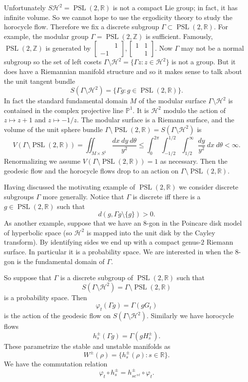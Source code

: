 \documentclass[12pt]{report}
\newcommand{\ZZ}{\mathbb{Z}}
\newcommand{\RR}{\mathbb{R}}
\newcommand{\PP}{\mathbb{P}}
\newcommand{\HH}{\mathcal H}
\newcommand{\PSL}{\operatorname{PSL}}
\theoremstyle{definition}
\begin{document}
Unfortunately $S\HH^2 = \PSL(2, \RR)$ is not a compact Lie group; in fact, it has infinite volume. So we cannot hope to use the ergodicity theory to study the horocycle flow.
Therefore we fix a discrete subgroup $\Gamma \subset \PSL(2, \RR)$. For example, the modular group $\Gamma = \PSL(2, \ZZ)$ is sufficient.
Famously, $\PSL(2, \ZZ)$ is generated by $\begin{bmatrix}&1\\-1\end{bmatrix},\begin{bmatrix}1&1\\&1\end{bmatrix}$.
Now $\Gamma$ may not be a normal subgroup so the set of left cosets $\Gamma \setminus \HH^2 = \{\Gamma z: z \in \HH^2\}$ is not a group.
But it does have a Riemannian manifold structure and so it makes sense to talk about the unit tangent bundle
$$S(\Gamma \setminus \HH^2) = \{\Gamma g: g \in \PSL(2, \RR)\}.$$
In fact the standard fundamental domain $M$ of the modular surface $\Gamma \setminus \HH^2$ is contained in the complex projective line $\PP^1$.
It is $\HH^2$ modulo the action of $z \mapsto z + 1$ and $z \mapsto -1/z$. The modular surface is a Riemann surface, and the volume of the unit sphere bundle $\Gamma \setminus \PSL(2, \RR) = S(\Gamma \setminus \HH^2)$ is
$$V(\Gamma \setminus \PSL(2, \RR)) = \iint_{M \times S^1} \frac{dx~dy~d\theta}{y^2} \leq \int_0^{2\pi} \int_{-1/2}^{1/2} \int_{1/2}^\infty \frac{dy}{y^2}~dx~d\theta < \infty.$$
Renormalizing we assume $V(\Gamma \setminus \PSL(2, \RR)) = 1$ as necessary. Then the geodesic flow and the horocycle flows drop to an action on $\Gamma \setminus \PSL(2, \RR)$.

Having discussed the motivating example of $\PSL(2, \RR)$ we consider discrete subgroups $\Gamma$ more generally.
Notice that $\Gamma$ is discrete iff there is a $g \in \PSL(2, \RR)$ such that
$$d(g, \Gamma g \setminus \{g\}) > 0.$$
As another example, suppose that we have an $8$-gon in the Poincare disk model of hyperbolic space (so $\HH^2$ is mapped into the unit disk by the Cayley transform).
By identifying sides we end up with a compact genus-$2$ Riemann surface. In particular it is a probability space. We are interested in when the $8$-gon is the fundamental domain of $\Gamma$.

So suppose that $\Gamma$ is a discrete subgroup of $\PSL(2, \RR)$ such that
$$S(\Gamma \setminus \HH^2) = \Gamma \setminus \PSL(2, \RR)$$
is a probability space. Then
$$\varphi_t(\Gamma g) = \Gamma (g G_t)$$
is the action of the geodesic flow on $S(\Gamma \setminus \HH^2)$.
Similarly we have horocycle flows
$$h_s^\pm(\Gamma g) = \Gamma(g H^\pm_s).$$
These parametrize the stable and unstable manifolds as
$$W^\pm(\rho) = \{h_s^\pm(\rho): s \in \RR\}.$$
We have the commutation relation
$$\varphi_t \circ h_s^\pm = h_{se^{\mp t}}^\pm \circ \varphi_t.$$
\end{document}
